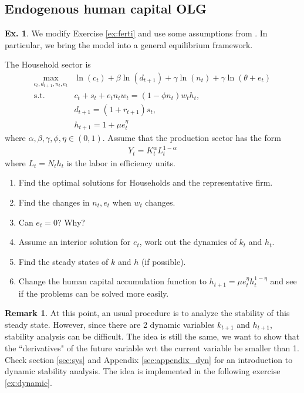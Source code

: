 \documentclass[11pt,a4paper]{book}
\theoremstyle{definition}\newtheorem{definition}{Definition}
\theoremstyle{definition}\newtheorem{fact}{Fact}
\theoremstyle{definition}\newtheorem{remark}{Remark}
\theoremstyle{definition}\newtheorem{ex}{Ex.}
\theoremstyle{definition}\newtheorem{project}{Project}
\theoremstyle{definition}\newtheorem{problem}{Problem}
\theoremstyle{definition}\newtheorem{example}{Example}
\numberwithin{theorem}{section}
\numberwithin{corollary}{chapter}
\numberwithin{assumption}{chapter}
\numberwithin{definition}{chapter}
\numberwithin{prop}{chapter}
\numberwithin{notation}{chapter}
\numberwithin{problem}{chapter}
\numberwithin{example}{chapter}
\numberwithin{fact}{chapter}
\numberwithin{ex}{chapter}
\begin{document}
	\subsection{Endogenous human capital OLG}
	\begin{ex}
		We modify Exercise \ref{ex:ferti} and use some assumptions from \citet{hirazawa2017labor}. In particular, we bring the model into a general equilibrium framework.
		
	The Household sector is
	\begin{align*}
			\max_{c_t, d_{t+1}, n_t, e_t} & \ln(c_t) + \beta \ln (d_{t+1}) + \gamma \ln ( n_t) + \gamma \ln (\theta + e_t) \\
			\text{s.t.}\ & c_t + s_t + e_t n_t w_t = (1-\phi n_t) w_t h_t, \\
			& d_{t+1} = (1+r_{t+1}) s_t, \\
			& h_{t+1} = 1 + \mu e_t^\eta
		\end{align*}
	where $\alpha,\beta,\gamma,\phi,\eta \in (0,1)$.
	Assume that the production sector has the form
	\begin{align*}
		Y_t = K_t^\alpha L_t^{1-\alpha}
	\end{align*}
	where $L_t = N_t h_t$ is the labor in efficiency units.
	
	\begin{enumerate}
		\item Find the optimal solutions for Households and the representative firm.
		\item Find the changes in $n_t, e_t$ when $w_t$ changes. 
		\item Can $e_t = 0$? Why?
		\item Assume an interior solution for $e_t$, work out the dynamics of $k_t$ and $h_t$.
		\item Find the steady states of $k$ and $h$ (if possible).
		\item Change the human capital accumulation function to $h_{t+1} = \mu e_t^\eta h_t^{1-\eta}$ and see if the problems can be solved more easily.
	\end{enumerate}
	
	\begin{remark}
		At this point, an usual procedure is to analyze the stability of this steady state. However, since there are 2 dynamic variables $k_{t+1}$ and $h_{t+1}$, stability analysis can be difficult. The idea is still the same, we want to show that the ``derivatives" of the future variable wrt the current variable be smaller than 1. Check section \ref{sec:sys} and Appendix \ref{sec:appendix_dyn} for an introduction to dynamic stability analysis. The idea is implemented in the following exercise \ref{ex:dynamic}.
	\end{remark}
	\end{ex}
	
\end{document}
